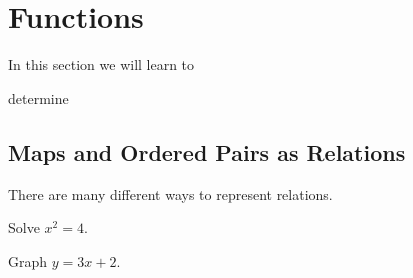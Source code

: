 \documentclass{book}
\begin{document}

\section{Functions}


\begin{objectives}{In this section we will learn to}
  \item
    determine
\end{objectives}




\subsection{Maps and Ordered Pairs as Relations}
There are many different ways to represent relations.

\example
Solve $x^2=4$.
\vfill



\example
Graph $y = 3x+2$.
\vfill



\end{document}
